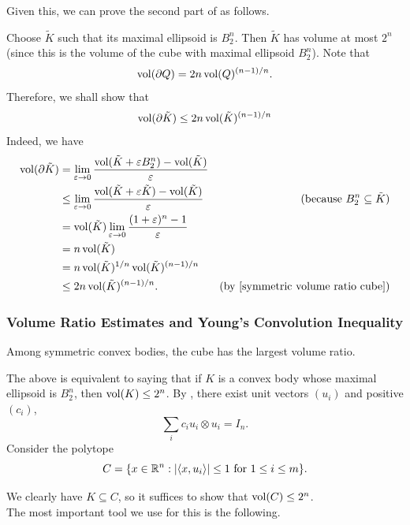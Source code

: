 Given this, we can prove the second part of  as follows.

Choose $\tilde{K}$ such that its maximal ellipsoid is $B_2^n$. Then $\tilde{K}$ has volume at most $2^n$ (since this is the volume of the cube with maximal ellipsoid $B_2^n$). Note that
\[ \operatorname{vol}(\partial Q) = 2n\operatorname{vol}(Q)^{(n-1)/n}. \]
Therefore, we shall show that
\[ \operatorname{vol}(\partial \tilde{K}) \leq 2n\operatorname{vol}(\tilde{K})^{(n-1)/n} \]
Indeed, we have
\begin{align*}
    \vol(\partial \tilde K) &= \lim_{\varepsilon\to 0}\frac{\vol(\tilde{K}+\varepsilon B_2^n) - \vol(\tilde{K})}{\varepsilon} \\
    &\leq \lim_{\varepsilon\to 0} \frac{\vol(\tilde{K}+\varepsilon \tilde{K}) - \vol(\tilde{K})}{\varepsilon} & (\text{because }B_2^n\subseteq \tilde{K}) \\
    &= \vol(\tilde{K}) \lim_{\varepsilon\to 0} \frac{(1+\varepsilon)^n - 1}{\varepsilon} \\
    &= n \vol(\tilde K) \\
    &= n \vol(\tilde{K})^{1/n} \vol(\tilde{K})^{(n-1)/n} \\
    &\leq 2n \vol(\tilde{K})^{(n-1)/n}. & (\text{by \Cref{symmetric volume ratio cube}})
\end{align*}

\subsubsection{Volume Ratio Estimates and Young's Convolution Inequality}

\begin{ftheo}
\label{symmetric volume ratio cube}
Among symmetric convex bodies, the cube has the largest volume ratio.
\end{ftheo}

The above is equivalent to saying that if $K$ is a convex body whose maximal ellipsoid is $B_2^n$, then $\operatorname{vol}(K)\leq 2^n$. By , there exist unit vectors $(u_i)$ and positive $(c_i)$,
\[ \sum_i c_i u_i\otimes u_i = I_n. \]
Consider the polytope
\begin{equation}
\label{eqn symmetric volume ratio cube polytope}
    C = \{ x\in\mathbb{R}^n : |\langle x,u_i\rangle| \leq 1\text{ for }1\leq i\leq m\}.    
\end{equation}

We clearly have $K\subseteq C$, so it suffices to show that $\operatorname{vol}(C) \leq 2^n$.\\
The most important tool we use for this is the following.

